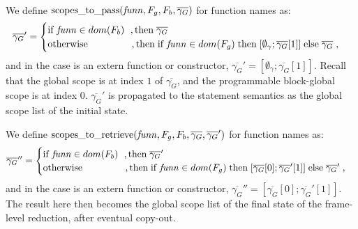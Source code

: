 \documentclass[UTF8]{article}
\begin{document}
\begin{figure}[ht!]
    \ottusedrule{\ottdruleframesXXcompOne{}} \\
    \ottusedrule{\ottdruleframesXXcompTwo{}}
\end{figure}

We define $\mathrm{scopes\_to\_pass}(\mathit{funn}, F_g , F_b , \overline{\gamma_G})$ for function names as:
 \[  \overline{\gamma_G}' = \begin{cases}
            \mathrm{if} \; \mathit{funn} \in dom(F_b)    \hspace{6pt} ,
            \mathrm{then} \;  \overline{\gamma_G}\\
            \mathrm{otherwise}    \hspace{45pt}     , 
            \mathrm{then} \; \mathrm{if} \; \mathit{funn} \in dom(F_g) \; \mathrm{then} \; [ \emptyset_{\gamma} ; \overline{\gamma_G}[1] ] \; \mathrm{else} \; \overline{\gamma_G}\;,
        \end{cases}\]
and in the case \funn{} is an extern function or constructor, $\overline{\gamma_G}' = [ \emptyset_{\gamma} ; \overline{\gamma_G}[1] ]$.
Recall that the global scope is at index $1$ of $\overline{\gamma_G}$, and the programmable block-global scope is at index $0$. $\overline{\gamma_G}'$ is propagated to the statement semantics as the global scope list of the initial state. 

We define $\mathrm{scopes\_to\_retrieve}(\mathit{funn}, F_g , F_b , \overline{\gamma_G}, \overline{\gamma_G}')$ for function names as:
\[\overline{\gamma_G}'' = \begin{cases}
            \mathrm{if} \; \mathit{funn} \in dom(F_b)    \hspace{6pt} ,
            \mathrm{then} \;   \overline{\gamma_G}'\\
            \mathrm{otherwise}    \hspace{45pt}     , 
            \mathrm{then} \; \mathrm{if} \; \mathit{funn} \in dom(F_g) \; \mathrm{then} \; [\overline{\gamma_G}[0];\overline{\gamma_G}'[1]] \; \mathrm{else} \; \overline{\gamma_G}'\; ,
        \end{cases}
\]
and in the case \funn{} is an extern function or constructor, $\overline{\gamma_G}'' = [\overline{\gamma_G}[0];\overline{\gamma_G}'[1]]$. The result here then becomes the global scope list of the final state of the frame-level reduction, after eventual copy-out.
\end{document}
